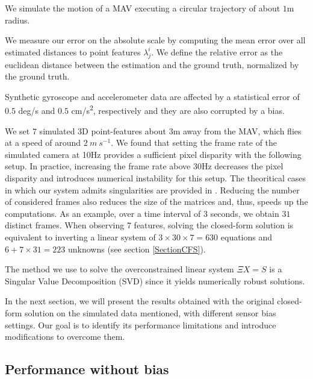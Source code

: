 \documentclass[letterpaper, 10 pt, conference]{ieeeconf}  %
\begin{document}
We simulate the motion of a MAV executing a circular trajectory of about $1$m radius.

We measure our error on the absolute scale by computing the mean error over all estimated distances to point features $\lambda_j^i$.
We define the relative error as the euclidean distance between the estimation and the ground truth,
normalized by the ground truth.

Synthetic gyroscope and accelerometer data are affected by a statistical error of $0.5$ deg/s and $0.5$ cm/s\textsuperscript{2}, respectively and they are also corrupted by a bias.

We set $7$ simulated 3D point-features about $3$m away from the MAV, which flies at a speed of around $2~m~s^{-1}$.
We found that setting the frame rate of the simulated camera at 10Hz provides a sufficient pixel disparity with the following setup.
In practice, increasing the frame rate above 30Hz decreases the pixel disparity and introduces numerical instability for this setup.
The theoritical cases in which our system admits singularities are provided in \cite{Martinelli2012}\cite{Martinelli2014}.
Reducing the number of considered frames also reduces the size of the matrices and, thus, speeds up the computations.
As an example, over a time interval of 3 seconds, we obtain $31$ distinct frames.
When observing 7 features, solving the closed-form solution is equivalent to inverting a linear system of $3\times 30\times 7 = 630$ equations and $6+7\times 31=223$ unknowns (see section \ref{SectionCFS}).

The method we use to solve the overconstrained linear system $\Xi X = S$ is a Singular Value Decomposition (SVD) since it yields numerically robust solutions.

In the next section, we will present the results obtained with the original closed-form solution on the simulated data mentioned, with different sensor bias settings.
Our goal is to identify its performance limitations and introduce modifications to overcome them.



\subsection{Performance without bias}
\end{document}
